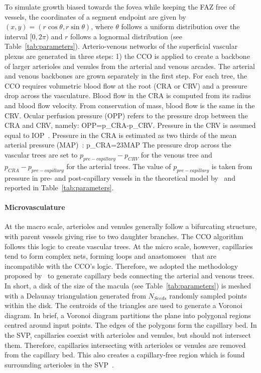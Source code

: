 \documentclass[11pt,]{article}
\let\oldequation\equation
\let\oldendequation\endequation
\renewenvironment{equation}
  {\linenomathNonumbers\oldequation}
  {\oldendequation\endlinenomath}
\begin{document}
To simulate growth biased towards the fovea while keeping the FAZ free
of vessels, the coordinates of a segment endpoint are given by
$(x,y)=(r\cos\theta, r\sin\theta)$, where $\theta$ follows a uniform
distribution over the interval $[0,2\pi)$ and $r$ follows a lognormal
distribution (see Table~\ref{tab:parameters}). Arterio-venous
networks of the superficial vascular plexus are generated in three
steps: 1) the CCO is applied to create a backbone of larger arterioles
and venules from the arterial and venous arcades. The arterial and
venous backbones are grown separately in the first step. For each
tree, the CCO requires volumetric blood flow at the root (CRA or CRV)
and a pressure drop across the vasculature. Blood flow in the CRA is
computed from its radius and blood flow velocity. From conservation of
mass, blood flow is the same in the CRV.
Ocular perfusion pressure (OPP) refers to the pressure drop between the CRA and CRV, namely:
\begin{equation}
OPP=p_{CRA}-p_{CRV}.\label{eq:OPP}
\end{equation}
Pressure in the CRV is assumed equal to IOP~\cite{Arciero2013,Guidoboni2014,Zheng2010}.
Pressure in the CRA is estimated as two thirds of the mean arterial pressure (MAP)~\cite{Arciero2013,Guidoboni2014,Zheng2010}:
\begin{equation}
p_{CRA}=\frac23MAP\label{eq:pCRA}
\end{equation}
The pressure drop across the vascular trees are set to
$p_{pre-capillary}-p_{CRV}$ for the venous tree and
$p_{CRA}-p_{pre-capillary}$ for the arterial trees. The value of
$p_{pre-capillary}$ is taken from pressure in pre- and post-capillary vessels in
the theoretical model by~\cite{Takahashi2009} and reported in
Table~\ref{tab:parameters}.

\paragraph{Microvasculature}\label{sec:microvasculature} At the macro
scale, arterioles and venules generally follow a bifurcating
structure, with parent vessels giving rise to two daughter
branches. The CCO algorithm follows this logic to create vascular
trees.  At the micro scale, however, capillaries tend to form complex
nets, forming loops and anastomoses~\cite{An2020} that are
incompatible with the CCO’s logic.
Therefore, we adopted the methodology proposed by~\cite{Linninger2013} to generate capillary beds connecting
the arterial and venous trees.
In short, a disk of the size of the macula (see Table~\ref{tab:parameters}) is meshed with a Delaunay
triangulation generated from $N_{Seeds}$ randomly sampled points
within the disk.
The centroids of the triangles are used to generate a Voronoi diagram.
In brief, a Voronoi diagram partitions the plane into polygonal regions centred around input points. 
The edges of the polygons form the capillary bed.
In the SVP, capillaries coexist with arterioles and venules, but should not intersect them.
Therefore, capillaries intersecting with arterioles or venules are removed from the capillary bed.
This also creates a capillary-free region which is found surrounding arterioles in the SVP~\cite{An2020}.
\end{document}
